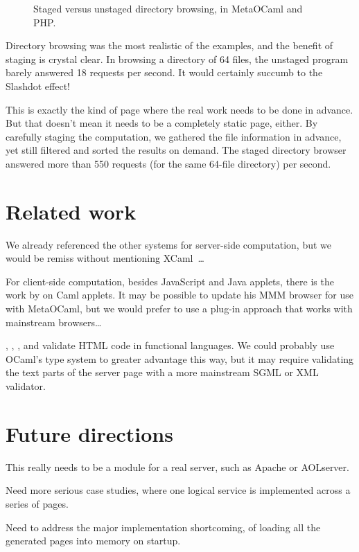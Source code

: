 \documentclass[preprint]{acm_proc_article-sp}
\def\MOC{MetaOCaml\xspace}
\newcommand{\myfig}[3]{%
  \begin{figure}[tbp]%
    #3%
    \caption{#2}%
    \label{fig:#1}%
  \end{figure}}
\newcommand{\gnuplot}[2]{%
  \myfig{#1}{#2}{}}
\begin{document}
\gnuplot{browse}{Staged versus unstaged directory browsing, in \MOC
  and PHP.}

Directory browsing was the most realistic of the examples, and
the benefit of staging is crystal clear.  In browsing a
directory of 64 files, the unstaged program barely answered 18
requests per second.  It would certainly succumb to the Slashdot
effect!

This is exactly the kind of page where the real work needs to be
done in advance.  But that doesn't mean it needs to be a
completely static page, either.  By carefully staging the
computation, we gathered the file information in advance, yet
still filtered and sorted the results on demand.  The staged
directory browser answered more than 550 requests (for the same
64-file directory) per second.


\section{Related work}
\label{sec:related}

We already referenced the other systems for server-side
computation, but we would be remiss without mentioning
XCaml~\cite{baretta04xcaml}\ldots

For client-side computation, besides JavaScript and Java
applets, there is the work by \citet{rouaix96web} on Caml
applets.  It may be possible to update his MMM browser for use
with \MOC{}, but we would prefer to use a plug-in approach that
works with mainstream browsers\ldots

\citet{elsman04typing}, \citet{wallace99haxml},
\citet{hosoya03xduce}, and \citet{ohl04xhtml} validate HTML code
in functional languages.  We could probably use OCaml's type
system to greater advantage this way, but it may require
validating the text parts of the server page with a more
mainstream SGML or XML validator.

\section{Future directions}
\label{sec:future}

  
 This really needs to be a module for a real server, such
  as Apache or AOLserver.
  
 Need more serious case studies, where one logical service
  is implemented across a series of pages.
  
 Need to address the major implementation shortcoming, of
  loading all the generated pages into memory on startup.
  
\end{document}
